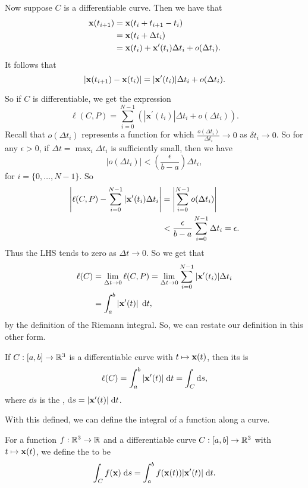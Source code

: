 \documentclass[a4paper]{scrreprt}
\begin{document}
Now suppose $C$ is a differentiable curve. Then we have that
\begin{align*}
	\mathbf{x}(t_{i + 1}) &= \mathbf{x}(t_i + t_{i + 1} - t_i) \\
					&= \mathbf{x}(t_i + \Delta t_i) \\
					&= \mathbf{x}(t_i) + \mathbf{x}'(t_i) \Delta t_i + o(\Delta t_i).
\end{align*}
It follows that
$$
|\mathbf{x}(t_{i + 1}) - \mathbf{x}(t_i) | = |\mathbf{x}'(t_i)| \Delta t_i + o(\Delta t_i). 
$$

So if $C$ is differentiable, we get the expression
$$
\ell(C, P)=\sum_{i=0}^{N-1}\left(\left|\mathbf{x}^{\prime}\left(t_{i}\right)\right| \Delta t_{i}+o\left(\Delta t_{i}\right)\right).
$$
Recall that $o(\Delta t_i)$ represents a function for which $\frac{o(\Delta t_i)}{\Delta t_i} \rightarrow 0$ as $\delta t_i \rightarrow 0$. So for any $\epsilon > 0$, if $\Delta t = \max_i \Delta t_i$  is sufficiently small, then we have
$$
|o(\Delta t_i) | < \left(\frac{\epsilon}{b - a}\right) \Delta t_i,
$$
for $i = \{0, \dots, N - 1\}$. So
\begin{align*}
	\left|\ell(C, P) - \sum_{i = 0}^{N - 1} |\mathbf{x}' (t_i) \Delta t_i \right| &= \left|\sum_{i = 0}^{N - 1} o(\Delta t_i)\right| \\
	&< \frac{\epsilon}{b - a} \sum_{i = 0}^{N - 1} \Delta{t_i} = \epsilon.
\end{align*}
Thus the LHS tends to zero as $\Delta t \rightarrow 0$. So we get that
\begin{align*}
	\ell(C) &= \lim_{\Delta t \to 0} \ell(C, P) = \lim_{\Delta t \to 0} \sum_{i = 0}^{N - 1} |\mathbf{x}'(t_i)| \Delta t_i \\
		&= \int_a^b \left|\mathbf{x}'(t)\right| \; \mathrm{d} t,
\end{align*}
by the definition of the Riemann integral.
So, we can restate our definition in this other form.

\begin{definition}
	If $C: [a, b] \rightarrow \mathbb{R}^3$ is a differentiable curve with $t \mapsto \mathbf{x}(t)$, then its  is
	$$
	\ell(C) = \int_a^b |\mathbf{x}'(t)| \; \mathrm{d} t = \int_C \mathrm{d} s,
	$$
where $\dd s$ is the , $\mathrm{d} s = |\mathbf{x}'(t)| \; \mathrm{d} t$.
\end{definition}

With this defined, we can define the integral of a function along a curve.

\begin{definition}
	For a function $f : \mathbb{R}^3 \rightarrow \mathbb{R}$ and a differentiable curve $C: [a, b] \rightarrow \mathbb{R}^3$ with $t \mapsto \mathbf{x}(t)$, we define the  to be
	$$
	\int_C f(\mathbf{x})\; \mathrm{d} s = \int_a^b f(\mathbf{x}(t)) |\mathbf{x}'(t)| \; \mathrm{d} t.
	$$
\end{definition}
\end{document}
